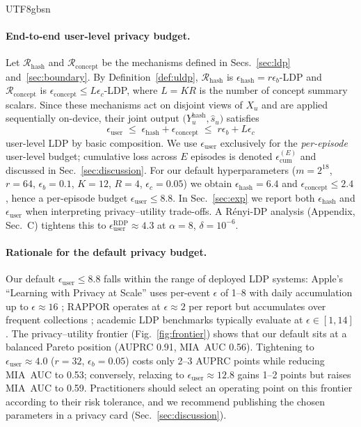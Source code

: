 \documentclass[lettersize,journal]{IEEEtran}
\begin{document}
\begin{CJK*}{UTF8}{gbsn}
\paragraph{End-to-end user-level privacy budget.}
Let $\mathcal{R}_{\text{hash}}$ and $\mathcal{R}_{\text{concept}}$ be the mechanisms defined in Secs.~\ref{sec:ldp} and~\ref{sec:boundary}. By Definition~\ref{def:uldp}, $\mathcal{R}_{\text{hash}}$ is $\epsilon_{\text{hash}}{=}r\epsilon_b$-LDP and $\mathcal{R}_{\text{concept}}$ is $\epsilon_{\text{concept}}{\le}L\epsilon_c$-LDP, where $L{=}K R$ is the number of concept summary scalars. Since these mechanisms act on disjoint views of $X_u$ and are applied sequentially on-device, their joint output $\bigl(Y^{\text{hash}}_u,\hat{s}_u\bigr)$ satisfies
\begin{equation}
  \epsilon_{\text{user}}
  \;\le\; \epsilon_{\text{hash}} + \epsilon_{\text{concept}}
  \;\le\; r\epsilon_b + L\epsilon_c
\end{equation}
user-level LDP by basic composition. We use $\epsilon_{\text{user}}$ exclusively for the \emph{per-episode} user-level budget; cumulative loss across $E$ episodes is denoted $\epsilon_{\text{cum}}^{(E)}$ and discussed in Sec.~\ref{sec:discussion}. For our default hyperparameters ($m{=}2^{18}$, $r{=}64$, $\epsilon_b{=}0.1$, $K{=}12$, $R{=}4$, $\epsilon_c{=}0.05$) we obtain $\epsilon_{\text{hash}}{=}6.4$ and $\epsilon_{\text{concept}}{\le}2.4$, hence a per-episode budget $\epsilon_{\text{user}} \le 8.8$. In Sec.~\ref{sec:exp} we report both $\epsilon_{\text{hash}}$ and $\epsilon_{\text{user}}$ when interpreting privacy--utility trade-offs. A R\'enyi-DP analysis (Appendix, Sec.~C) tightens this to $\epsilon_{\text{user}}^{\text{RDP}}{\approx}4.3$ at $\alpha{=}8$, $\delta{=}10^{-6}$.

\paragraph{Rationale for the default privacy budget.}
Our default $\epsilon_{\text{user}} \le 8.8$ falls within the range of deployed LDP systems: Apple's ``Learning with Privacy at Scale'' uses per-event $\epsilon$ of 1--8 with daily accumulation up to $\epsilon{\approx}16$ \cite{apple2017privacy}; RAPPOR operates at $\epsilon{\approx}2$ per report but accumulates over frequent collections \cite{erling2014rappor}; academic LDP benchmarks typically evaluate at $\epsilon \in [1, 14]$ \cite{wang2020surveyldp}. The privacy--utility frontier (Fig.~\ref{fig:frontier}) shows that our default sits at a balanced Pareto position (AUPRC 0.91, MIA~AUC 0.56). Tightening to $\epsilon_{\text{user}}{\approx}4.0$ ($r{=}32$, $\epsilon_b{=}0.05$) costs only 2--3 AUPRC points while reducing MIA~AUC to 0.53; conversely, relaxing to $\epsilon_{\text{user}}{\approx}12.8$ gains 1--2 points but raises MIA~AUC to 0.59. Practitioners should select an operating point on this frontier according to their risk tolerance, and we recommend publishing the chosen parameters in a privacy card (Sec.~\ref{sec:discussion}).


\end{CJK*}
\end{document}

